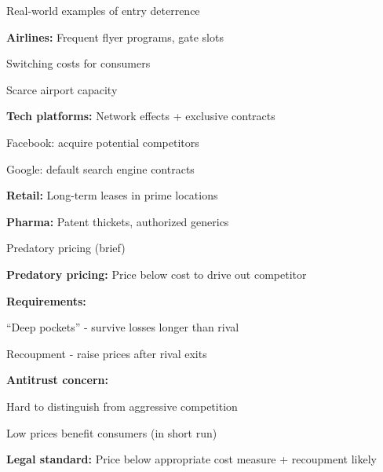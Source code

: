 \documentclass[notes,11pt, aspectratio=169]{beamer}
\newenvironment{wideitemize}{\itemize\addtolength{\itemsep}{10pt}}{\enditemize}
\begin{document}
\begin{frame}{Real-world examples of entry deterrence}
	\begin{wideitemize}
		\item \textbf{Airlines:} Frequent flyer programs, gate slots
		\begin{wideitemize}
			\vspace{3pt}
			\item Switching costs for consumers
			\item Scarce airport capacity
		\end{wideitemize}
		\item \textbf{Tech platforms:} Network effects + exclusive contracts
		\begin{wideitemize}
			\vspace{3pt}
			\item Facebook: acquire potential competitors
			\item Google: default search engine contracts
		\end{wideitemize}
		\item \textbf{Retail:} Long-term leases in prime locations
		\item \textbf{Pharma:} Patent thickets, authorized generics
	\end{wideitemize}
\end{frame}

\begin{frame}{Predatory pricing (brief)}
	\begin{wideitemize}
		\item \textbf{Predatory pricing:} Price below cost to drive out competitor
		\item \textbf{Requirements:}
		\begin{wideitemize}
			\vspace{5pt}
			\item ``Deep pockets'' - survive losses longer than rival
			\item Recoupment - raise prices after rival exits
		\end{wideitemize}
		\item \textbf{Antitrust concern:}
		\begin{wideitemize}
			\vspace{5pt}
			\item Hard to distinguish from aggressive competition
			\item Low prices benefit consumers (in short run)
		\end{wideitemize}
		\item \textbf{Legal standard:} Price below appropriate cost measure + recoupment likely
	\end{wideitemize}
\end{frame}
\end{document}
